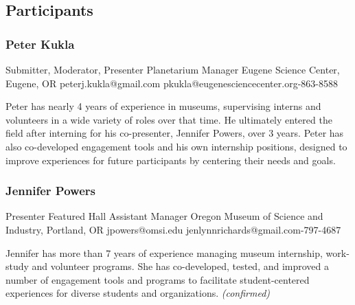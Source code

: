 \documentclass{report}
\begin{document}
            \subsection*{Participants}
              \subsubsection*{ Peter Kukla }
              Submitter, Moderator, Presenter\newline
              Planetarium Manager\newline
              Eugene Science Center, Eugene, OR
              \newline
              peterj.kukla@gmail.com\newline
              pkukla@eugenesciencecenter.org-863-8588\newline

              Peter has nearly 4 years of experience in museums, supervising interns and volunteers in a wide variety of roles over that time. He ultimately entered the field after interning for his co-presenter, Jennifer Powers, over 3 years. Peter has also co-developed engagement tools and his own internship positions, designed to improve experiences for future participants by centering their needs and goals.\newline


              

              
                \subsubsection*{ Jennifer Powers }
                Presenter\newline
                Featured Hall Assistant Manager\newline
                Oregon Museum of Science and Industry, Portland, OR
                \newline
                jpowers@omsi.edu\newline
                jenlynnrichards@gmail.com-797-4687\newline

                Jennifer has more than 7 years of experience managing museum internship, work-study and volunteer programs. She has co-developed, tested, and improved a number of engagement tools and programs to facilitate student-centered experiences for diverse students and organizations.
                \emph{ (confirmed) }
              
\end{document}

